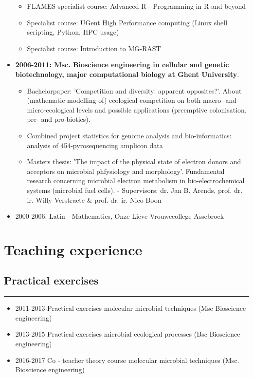 \documentclass[a4paper,11pt,oneside]{article}
\begin{document}
\begin{itemize}
\begin{itemize}
      \item FLAMES specialist course: Advanced R - Programming in R and beyond
      \item Specialist course: UGent High Performance computing (Linux shell scripting, Python, HPC usage)
      \item Specialist course: Introduction to MG-RAST
    \end{itemize}
\item \textbf{2006-2011: Msc. Bioscience engineering in cellular and genetic biotechnology, major computational biology at Ghent University}. 
	\begin{itemize}
		\item Bachelorpaper: 'Competition and diversity: apparent opposites?'. About (mathematic modelling of) ecological competition on both macro- and micro-ecological levels and possible applications (preemptive colonisation, pre- and pro-biotics).
		\item Combined project statistics for genome analysis and bio-informatics: analysis of 454-pyrosequencing amplicon data
		\item Masters thesis: 'The impact of the physical state of electron donors and acceptors on microbial phfysiology and morphology'. Fundamental research concerning microbial electron metabolism in bio-electrochemical systems (microbial fuel cells). - Supervisors: dr. Jan B. Arends, prof. dr. ir. Willy Verstraete \& prof. dr. ir. Nico Boon
	\end{itemize}
\item 2000-2006: Latin - Mathematics, Onze-Lieve-Vrouwecollege Assebroek
\end{itemize}



\section*{Teaching experience}
\subsection*{Practical exercises}
\rule{\textwidth}{1pt}
\begin{itemize}
  \item 2011-2013 Practical exercises molecular microbial techniques (Msc Bioscience engineering)
  \item 2013-2015 Practical exercises microbial ecological processes (Bsc Bioscience engineering)
  \item 2016-2017 Co - teacher theory course molecular microbial techniques (Msc. Bioscience engineering) 
\end{itemize}
\end{document}
